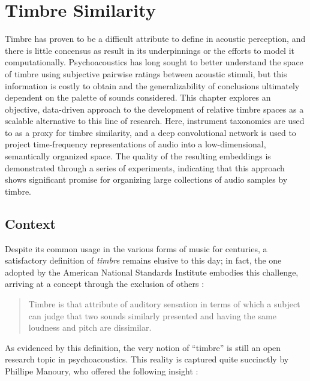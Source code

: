
\graphicspath{{4/figures/}}

\chapter{Timbre Similarity}
\label{chp:timbre}

Timbre has proven to be a difficult attribute to define in acoustic perception, and there is little concensus as result in its underpinnings or the efforts to model it computationally.
Psychoacoustics has long sought to better understand the space of timbre using subjective pairwise ratings between acoustic stimuli, but this information is costly to obtain and the generalizability of conclusions ultimately dependent on the palette of sounds considered.
This chapter explores an objective, data-driven approach to the development of relative timbre spaces as a scalable alternative to this line of research.
Here, instrument taxonomies are used to as a proxy for timbre similarity, and a deep convolutional network is used to project time-frequency representations of audio into a low-dimensional, semantically organized space.
The quality of the resulting embeddings is demonstrated through a series of experiments, indicating that this approach shows significant promise for organizing large collections of audio samples by timbre.


\section{Context}
\label{sec:context}

Despite its common usage in the various forms of music for centuries, a satisfactory definition of \emph{timbre} remains elusive to this day; in fact, the one adopted by the American National Standards Institute embodies this challenge, arriving at a concept through the exclusion of others \cite{ANSI197x}:

\begin{quote}
Timbre is that attribute of auditory sensation in terms of which a subject can judge that two sounds similarly presented and having the same loudness and pitch are dissimilar.
\end{quote}

As evidenced by this definition, the very notion of ``timbre'' is still an open research topic in psychoacoustics.
This reality is captured quite succinctly by Phillipe Manoury, who offered the following insight \cite{Manoury19XX}:


